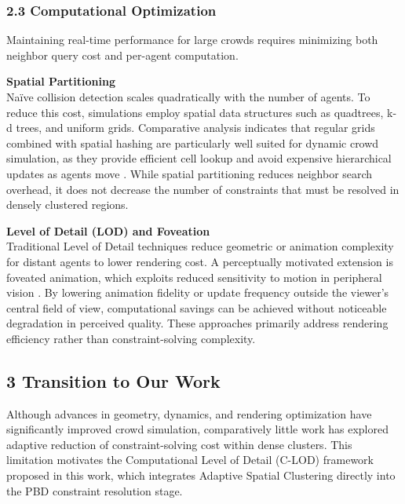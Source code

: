 
\subsubsection{2.3 Computational Optimization}
Maintaining real-time performance for large crowds requires minimizing both neighbor query cost and per-agent computation.

\vspace{0.5em}
\textbf{Spatial Partitioning}\\
Naïve collision detection scales quadratically with the number of agents. To reduce this cost, simulations employ spatial data structures such as quadtrees, k-d trees, and uniform grids. Comparative analysis indicates that regular grids combined with spatial hashing are particularly well suited for dynamic crowd simulation, as they provide efficient cell lookup and avoid expensive hierarchical updates as agents move \cite{Bo2014}. While spatial partitioning reduces neighbor search overhead, it does not decrease the number of constraints that must be resolved in densely clustered regions.

\vspace{0.5em}
\textbf{Level of Detail (LOD) and Foveation}\\
Traditional Level of Detail techniques reduce geometric or animation complexity for distant agents to lower rendering cost. A perceptually motivated extension is foveated animation, which exploits reduced sensitivity to motion in peripheral vision \cite{Stancu2025}. By lowering animation fidelity or update frequency outside the viewer's central field of view, computational savings can be achieved without noticeable degradation in perceived quality. These approaches primarily address rendering efficiency rather than constraint-solving complexity.


\subsection{3 Transition to Our Work}

Although advances in geometry, dynamics, and rendering optimization have significantly improved crowd simulation, comparatively little work has explored adaptive reduction of constraint-solving cost within dense clusters. This limitation motivates the Computational Level of Detail (C-LOD) framework proposed in this work, which integrates Adaptive Spatial Clustering directly into the PBD constraint resolution stage.
